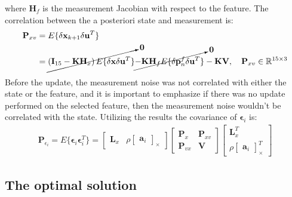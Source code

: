 where $\mathbf{H}_f$ is the measurement Jacobian with respect to the feature. The correlation between the a posteriori state and measurement is:
\begin{equation}
\begin{aligned}    
    \mathbf{P}_{xv} &= E\{\delta\mathbf{x}_{k+1}\delta\mathbf{u}^T\} \\ &= 
    \cancelto{\mathbf{0}}{\left(\mathbf{I}_{15}-\mathbf{K}\mathbf{H}_x\right)E\{\delta\mathbf{x}\delta\mathbf{u}^T\}}\cancelto{\mathbf{0}}{-\mathbf{K}\mathbf{H}_f E\{\delta\mathbf{p}_n^f\delta\mathbf{u}^T\}} - \mathbf{K}\mathbf{V},\quad\mathbf{P}_{xv}\in\mathbb{R}^{15\times 3}
\end{aligned}
\end{equation}

Before the update, the measurement noise was not correlated with either the state or the feature, and it is important to emphasize if there was no update performed on the selected feature, then the measurement noise wouldn't be correlated with the state. Utilizing the results the covariance of $\boldsymbol{\epsilon}_i$ is:
\begin{equation}
\begin{aligned}
    \mathbf{P}_{\epsilon_i}= E\{\boldsymbol{\epsilon}_i\boldsymbol{\epsilon}_i^T\} = 
    \begin{bmatrix}
        \mathbf{L}_x &  
        \rho\begin{bmatrix}
            \mathbf{a}_i
        \end{bmatrix}_\times
    \end{bmatrix}
    \begin{bmatrix}
        \mathbf{P}_x & \mathbf{P}_{xv} \\
        \mathbf{P}_{vx} & \mathbf{V}
    \end{bmatrix}
    \begin{bmatrix}
        \mathbf{L}_x^T \\  
        \rho\begin{bmatrix}
            \mathbf{a}_i
        \end{bmatrix}_\times^T
    \end{bmatrix}
\end{aligned}
\end{equation}

\subsection{The optimal solution}

